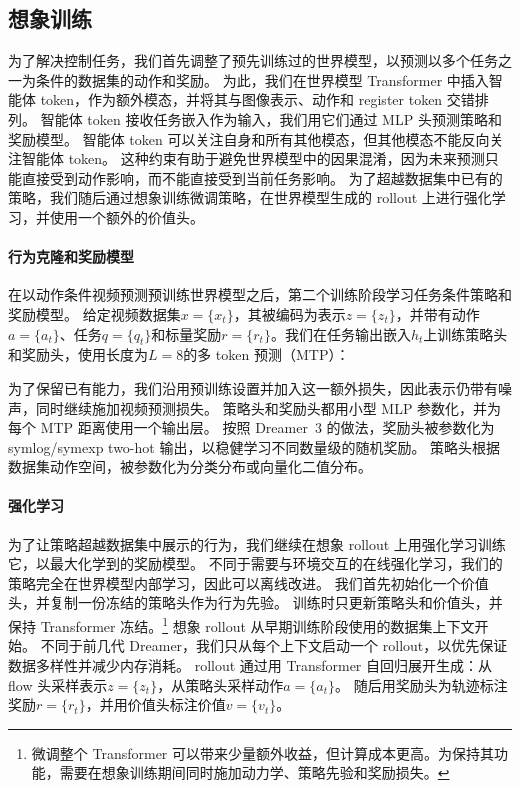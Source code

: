 \documentclass[11pt]{article}
\begin{document}
\subsection{想象训练}

为了解决控制任务，我们首先调整了预先训练过的世界模型，以预测以多个任务之一为条件的数据集的动作和奖励。
为此，我们在世界模型 Transformer 中插入智能体 token，作为额外模态，并将其与图像表示、动作和 register token 交错排列。
智能体 token 接收任务嵌入作为输入，我们用它们通过 MLP 头预测策略和奖励模型。
智能体 token 可以关注自身和所有其他模态，但其他模态不能反向关注智能体 token。
这种约束有助于避免世界模型中的因果混淆，因为未来预测只能直接受到动作影响，而不能直接受到当前任务影响。
为了超越数据集中已有的策略，我们随后通过想象训练微调策略，在世界模型生成的 rollout 上进行强化学习，并使用一个额外的价值头。

\paragraph{行为克隆和奖励模型}

在以动作条件视频预测预训练世界模型之后，第二个训练阶段学习任务条件策略和奖励模型。
给定视频数据集$x=\{x_t\}$，其被编码为表示$z=\{z_t\}$，并带有动作$a=\{a_t\}$、任务$q=\{q_t\}$和标量奖励$r=\{r_t\}$。我们在任务输出嵌入$h_t$上训练策略头和奖励头，使用长度为$L=8$的多 token 预测（MTP）\citep{gloeckle2024mtp}：


为了保留已有能力，我们沿用预训练设置并加入这一额外损失，因此表示仍带有噪声，同时继续施加视频预测损失。
策略头和奖励头都用小型 MLP 参数化，并为每个 MTP 距离使用一个输出层。
按照 Dreamer~3 的做法，奖励头被参数化为 symlog/symexp two-hot 输出\citep{dreamerv3}，以稳健学习不同数量级的随机奖励。
策略头根据数据集动作空间，被参数化为分类分布或向量化二值分布。

\paragraph{强化学习}

为了让策略超越数据集中展示的行为，我们继续在想象 rollout 上用强化学习训练它，以最大化学到的奖励模型。
不同于需要与环境交互的在线强化学习，我们的策略完全在世界模型内部学习，因此可以离线改进。
我们首先初始化一个价值头，并复制一份冻结的策略头作为行为先验。
训练时只更新策略头和价值头，并保持 Transformer 冻结。\footnote{微调整个 Transformer 可以带来少量额外收益，但计算成本更高。为保持其功能，需要在想象训练期间同时施加动力学、策略先验和奖励损失。}
%
想象 rollout 从早期训练阶段使用的数据集上下文开始。
不同于前几代 Dreamer，我们只从每个上下文启动一个 rollout，以优先保证数据多样性并减少内存消耗。
rollout 通过用 Transformer 自回归展开生成：从 flow 头采样表示$z=\{z_t\}$，从策略头采样动作$a=\{a_t\}$。
随后用奖励头为轨迹标注奖励$r=\{r_t\}$，并用价值头标注价值$v=\{v_t\}$。
\end{document}
